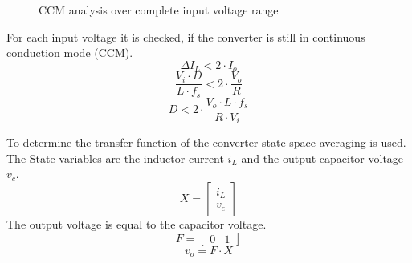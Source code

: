 \documentclass[a4paper,11pt,fleqn]{article}
\begin{document}
\begin{figure}[h!]
    \centering
    \caption{CCM analysis over complete input voltage range}
    \label{fig_ccm}
\end{figure}

For each input voltage it is checked, if the converter is still in continuous 
conduction mode (CCM). 
\[ \Delta I_L < 2 \cdot I_o \]
\[ \dfrac{V_i \cdot D}{L \cdot f_s} < 2 \cdot \dfrac{V_o}{R} \]
\[ D < 2 \cdot \dfrac{V_o \cdot L \cdot f_s}{R \cdot V_i} \]

To determine the transfer function of the converter state-space-averaging is used. The State variables are the inductor current $i_L$ and the output capacitor voltage $v_c$. 
\[ X = \begin{bmatrix}i_L\\v_c\end{bmatrix} \]
The output voltage is equal to the capacitor voltage. 
\[ F = \begin{bmatrix}0 & 1\end{bmatrix} \]
\[ v_o = F \cdot X \]
\end{document}
